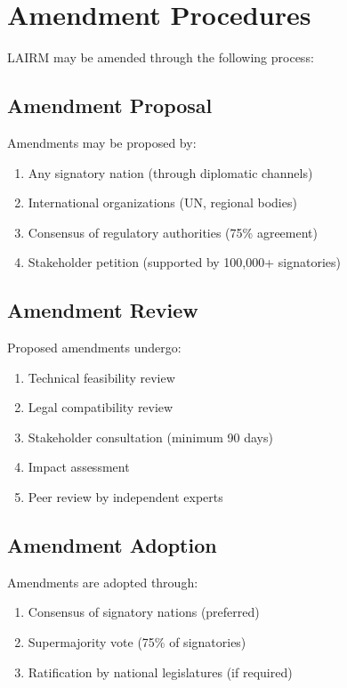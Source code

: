 \documentclass[12pt,a4paper,twoside,openright]{book}
\begin{document}
\section{Amendment Procedures}
\label{sec:amendments}

LAIRM may be amended through the following process:

\subsection{Amendment Proposal}

Amendments may be proposed by:
\begin{enumerate}
    \item Any signatory nation (through diplomatic channels)
    \item International organizations (UN, regional bodies)
    \item Consensus of regulatory authorities (75\% agreement)
    \item Stakeholder petition (supported by 100,000+ signatories)
\end{enumerate}

\subsection{Amendment Review}

Proposed amendments undergo:
\begin{enumerate}
    \item Technical feasibility review
    \item Legal compatibility review
    \item Stakeholder consultation (minimum 90 days)
    \item Impact assessment
    \item Peer review by independent experts
\end{enumerate}

\subsection{Amendment Adoption}

Amendments are adopted through:
\begin{enumerate}
    \item Consensus of signatory nations (preferred)
    \item Supermajority vote (75\% of signatories)
    \item Ratification by national legislatures (if required)
\end{enumerate}
\end{document}
